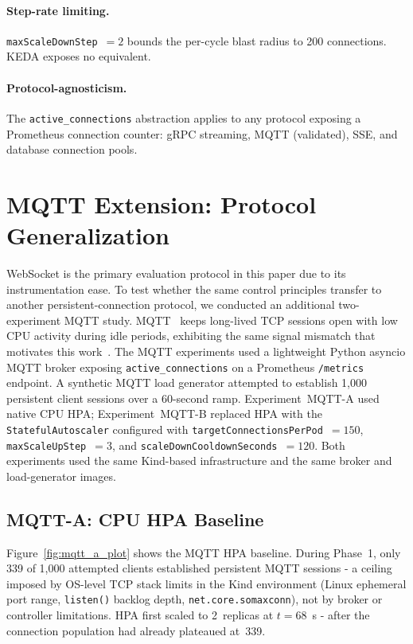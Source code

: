 \documentclass[3p,twocolumn]{elsarticle}
\theoremstyle{plain}%
\theoremstyle{definition}%
\begin{document}
\paragraph{Step-rate limiting.}
\texttt{maxScaleDownStep}~$= 2$ bounds the per-cycle blast radius to 200 connections. KEDA exposes no equivalent.

\paragraph{Protocol-agnosticism.}
The \texttt{active\_connections} abstraction applies to any protocol exposing a Prometheus connection counter: gRPC streaming, MQTT (validated), SSE, and database connection pools.



\section{MQTT Extension: Protocol Generalization}
\label{sec:mqtt_extension}

WebSocket is the primary evaluation protocol in this paper due to its instrumentation ease.
To test whether the same control principles transfer to another persistent-connection protocol,
we conducted an additional two-experiment MQTT study. MQTT~\cite{mqtt_v31} keeps long-lived
TCP sessions open with low CPU activity during idle periods, exhibiting the same signal
mismatch that motivates this work~\cite{soni2017mqtt}. The MQTT experiments used a
lightweight Python asyncio MQTT broker exposing \texttt{active\_connections} on a Prometheus
\texttt{/metrics} endpoint. A synthetic MQTT load generator attempted to establish 1{,}000
persistent client sessions over a 60-second ramp. Experiment~MQTT-A used native CPU HPA;
Experiment~MQTT-B replaced HPA with the \texttt{StatefulAutoscaler} configured with
\texttt{targetConnectionsPerPod}~$= 150$, \texttt{maxScaleUpStep}~$= 3$, and
\texttt{scaleDownCooldownSeconds}~$= 120$. Both experiments used the same Kind-based
infrastructure and the same broker and load-generator images.

\subsection{MQTT-A: CPU HPA Baseline}

Figure~\ref{fig:mqtt_a_plot} shows the MQTT HPA baseline. During Phase~1, only 339 of 1{,}000
attempted clients established persistent MQTT sessions - a ceiling imposed by OS-level TCP
stack limits in the Kind environment (Linux ephemeral port range, \texttt{listen()} backlog
depth, \texttt{net.core.somaxconn}), not by broker or controller limitations. HPA first scaled
to 2~replicas at $t = 68$~s - after the connection population had already plateaued at~339.
\end{document}
